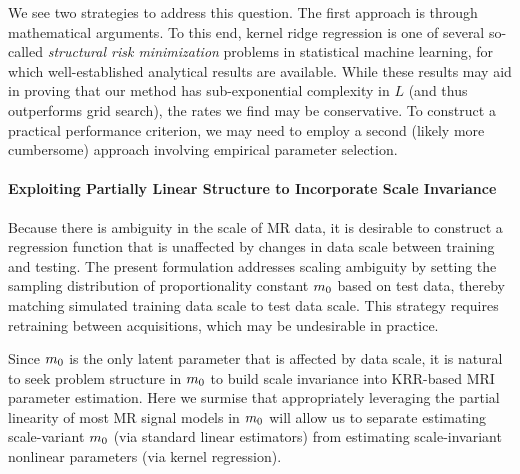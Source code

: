 We see two strategies to address this question.
The first approach 
is through mathematical arguments.
To this end,
kernel ridge regression
is one of several so-called 
\emph{structural risk minimization} problems
in statistical machine learning,
for which well-established analytical results are available.
While these results may aid 
in proving that our method 
has sub-exponential complexity in $L$
(and thus outperforms grid search),
the rates we find may be conservative.
To construct a practical performance criterion,
we may need to employ a second 
(likely more cumbersome) approach
involving empirical parameter selection.

\paragraph{Exploiting Partially Linear Structure to Incorporate Scale Invariance}
Because there is ambiguity
in the scale of MR data,
it is desirable
to construct a regression function
that is unaffected
by changes in data scale 
between training and testing.
The present formulation 
addresses scaling ambiguity
by setting the sampling distribution
of proportionality constant $m_0$
based on test data,
thereby matching simulated training data scale
to test data scale.
This strategy requires retraining 
between acquisitions,
which may be undesirable in practice.

Since $m_0$ is the only latent parameter
that is affected by data scale,
it is natural
to seek problem structure
in $m_0$ 
to build scale invariance
into KRR-based MRI parameter estimation.
Here we surmise 
that appropriately leveraging the partial linearity
of most MR signal models in $m_0$
will allow us
to separate estimating scale-variant $m_0$
(via standard linear estimators)
from estimating scale-invariant nonlinear parameters
(via kernel regression).

